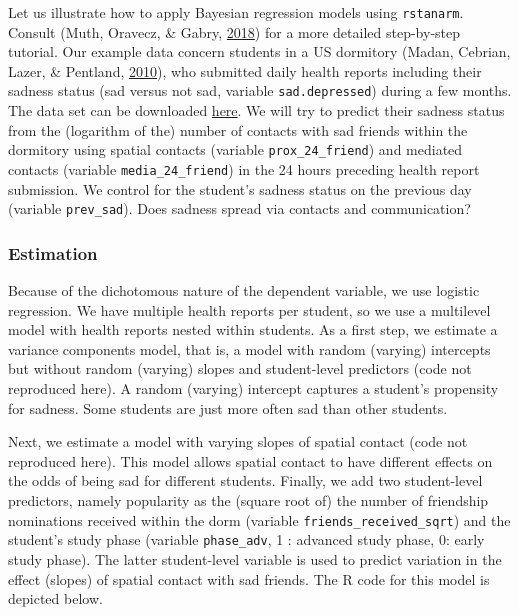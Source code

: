 \documentclass[doc]{apa6}
\begin{document}
Let us illustrate how to apply Bayesian regression models using
\texttt{rstanarm}. Consult (Muth, Oravecz, \& Gabry,
\protect\hyperlink{ref-TQMP14-2-99}{2018}) for a more detailed
step-by-step tutorial. Our example data concern students in a US
dormitory (Madan, Cebrian, Lazer, \& Pentland,
\protect\hyperlink{ref-MadanSocialsensingepidemiological2010}{2010}),
who submitted daily health reports including their sadness status (sad
versus not sad, variable \texttt{sad.depressed}) during a few months.
The data set can be downloaded
\href{https://wdenooy.github.io/Switch2Bayesian/sadness.csv}{here}. We
will try to predict their sadness status from the (logarithm of the)
number of contacts with sad friends within the dormitory using spatial
contacts (variable \texttt{prox\_24\_friend}) and mediated contacts
(variable \texttt{media\_24\_friend}) in the 24 hours preceding health
report submission. We control for the student's sadness status on the
previous day (variable \texttt{prev\_sad}). Does sadness spread via
contacts and communication?

\subsubsection{Estimation}\label{estimation}

Because of the dichotomous nature of the dependent variable, we use
logistic regression. We have multiple health reports per student, so we
use a multilevel model with health reports nested within students. As a
first step, we estimate a variance components model, that is, a model
with random (varying) intercepts but without random (varying) slopes and
student-level predictors (code not reproduced here). A random (varying)
intercept captures a student's propensity for sadness. Some students are
just more often sad than other students.

Next, we estimate a model with varying slopes of spatial contact (code
not reproduced here). This model allows spatial contact to have
different effects on the odds of being sad for different students.
Finally, we add two student-level predictors, namely popularity as the
(square root of) the number of friendship nominations received within
the dorm (variable \texttt{friends\_received\_sqrt}) and the student's
study phase (variable \texttt{phase\_adv}, 1 : advanced study phase, 0:
early study phase). The latter student-level variable is used to predict
variation in the effect (slopes) of spatial contact with sad friends.
The R code for this model is depicted below.
\end{document}
